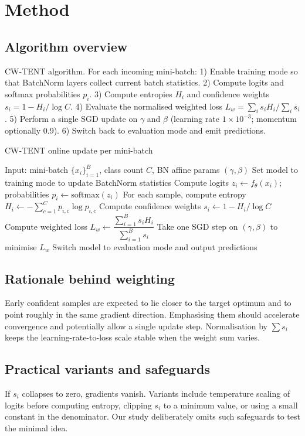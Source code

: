 \documentclass{article} %
\begin{document}
\section{Method}
\label{sec:method}
\subsection{Algorithm overview}
CW-TENT algorithm. For each incoming mini-batch: 1) Enable training mode so that BatchNorm layers collect current batch statistics. 2) Compute logits and softmax probabilities \(p_{i}\). 3) Compute entropies \(H_{i}\) and confidence weights \(s_{i} = 1 - H_{i}/\log C\). 4) Evaluate the normalised weighted loss \(L_{w} = \sum_{i} s_{i} H_{i} / \sum_{i} s_{i}\). 5) Perform a single SGD update on \(\gamma\) and \(\beta\) (learning rate \(1\times 10^{-3}\); momentum optionally 0.9). 6) Switch back to evaluation mode and emit predictions.

\begin{algorithm}
\caption{CW-TENT online update per mini-batch}
\begin{algorithmic}
  \State Input: mini-batch \(\{x_{i}\}_{i=1}^{B}\), class count \(C\), BN affine params \((\gamma,\beta)\)
  \State Set model to training mode to update BatchNorm statistics
  \State Compute logits \(z_{i} \leftarrow f_{\theta}(x_{i})\); probabilities \(p_{i} \leftarrow \mathrm{softmax}(z_{i})\)
  \State For each sample, compute entropy \(H_{i} \leftarrow -\sum_{c=1}^{C} p_{i,c} \log p_{i,c}\)
  \State Compute confidence weights \(s_{i} \leftarrow 1 - H_{i}/\log C\)
  \State Compute weighted loss \(L_{w} \leftarrow \dfrac{\sum_{i=1}^{B} s_{i} H_{i}}{\sum_{i=1}^{B} s_{i}}\)
  \State Take one SGD step on \((\gamma,\beta)\) to minimise \(L_{w}\)
  \State Switch model to evaluation mode and output predictions
\end{algorithmic}
\end{algorithm}

\subsection{Rationale behind weighting}
Early confident samples are expected to lie closer to the target optimum and to point roughly in the same gradient direction. Emphasising them should accelerate convergence and potentially allow a single update step. Normalisation by \(\sum s_{i}\) keeps the learning-rate-to-loss scale stable when the weight sum varies.

\subsection{Practical variants and safeguards}
If \(s_{i}\) collapses to zero, gradients vanish. Variants include temperature scaling of logits before computing entropy, clipping \(s_{i}\) to a minimum value, or using a small constant in the denominator. Our study deliberately omits such safeguards to test the minimal idea.
\end{document}

